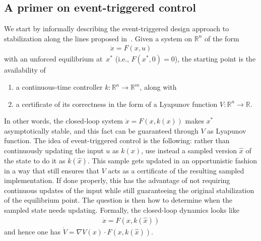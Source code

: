 \documentclass{autart}
\newcommand{\real}{{\mathbb{R}}}
\newcommand{\map}[3]{#1: #2 \rightarrow #3}
\renewcommand{\hat}{\widehat}
\begin{document}
\subsection{A primer on event-triggered control}\label{se:primer}

{We start by informally describing the event-triggered design approach
to stabilization along the lines proposed in~\citep{PT:07}}.  Given a
system on $\real^n$ of the form
\begin{align*}
  \dot x = F(x,u)
\end{align*}
with an unforced equilibrium at~$x^*$ (i.e., $F(x^*,0) = 0$), the
starting point is the availability of
\begin{enumerate}
\item a continuous-time controller $\map{k}{\real^n}{\real^m}$, along
  with
\item a certificate of its correctness in the form of a Lyapunov
  function $\map{V}{\real^n}{\real}$.
\end{enumerate}
In other words, the closed-loop system $\dot x = F(x,k(x))$ makes
$x^*$ asymptotically stable, and this fact can be guaranteed through
$V$ as Lyapunov function. The idea of event-triggered control is the
following: rather than continuously updating the input $u$ as $k(x)$,
use instead a sampled version $\hat{x}$ of the state to do it as
$k(\hat{x})$. This sample gets updated in an opportunistic fashion in
a way that still ensures that $V$ acts as a certificate of the
resulting sampled implementation. If done properly, this has the
advantage of not requiring continuous updates of the input while still
guaranteeing the original stabilization of the equilibrium point. The
question is then how to determine when the sampled state needs
updating.  Formally, the closed-loop dynamics looks like
\begin{align}\label{eq:dynamicsgeneral}
  \dot x = F(x,k(\hat{x}))  
\end{align}
and hence one has $\dot V = \nabla V(x) \cdot F(x,k(\hat{x}))$.
\end{document}
